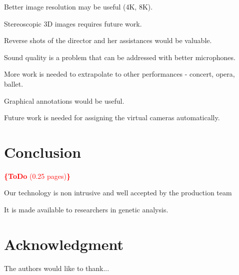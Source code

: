 \documentclass[conference]{IEEEtran}
\newcommand{\todo}[1]{\noindent\textcolor{red}{{\bf \{ToDo} #1{\bf \}}}}
\begin{document}
Better image resolution may be useful (4K, 8K).

Stereoscopic 3D images requires future work.

Reverse shots of the director and her assistances would be valuable.

Sound quality is a problem that can be addressed with better microphones.

More work is needed to extrapolate to other performances - concert, opera, ballet.

Graphical annotations would be useful.

Future work is needed for assigning the virtual cameras automatically.



\section{Conclusion}
\todo{(0.25 pages)}

Our technology is non intrusive and well accepted by the production team

It is made available to researchers in genetic analysis.




 

\section*{Acknowledgment}

The authors would like to thank...













\end{document}
